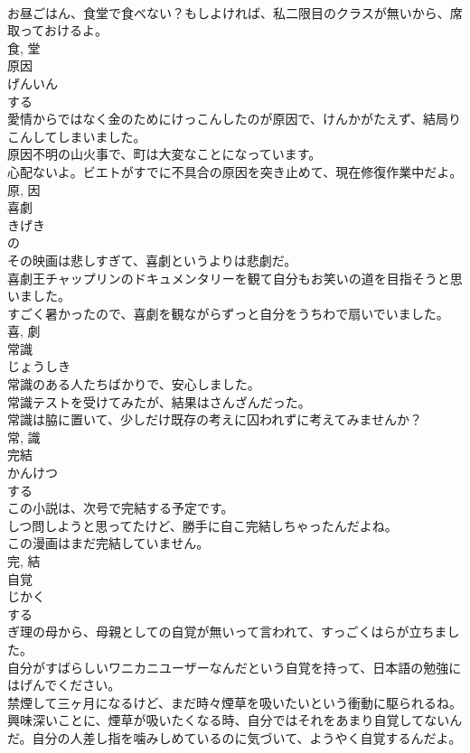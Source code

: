 \documentclass[8pt]{extreport}
\begin{document}
\begin{CJK}{UTF8}{min}
\\	お昼ごはん、食堂で食べない？もしよければ、私二限目のクラスが無いから、席取っておけるよ。	
\\	食, 堂	
\\	原因	
\\	げんいん	
\\	する 
\\	愛情からではなく金のためにけっこんしたのが原因で、けんかがたえず、結局りこんしてしまいました。	
\\	原因不明の山火事で、町は大変なことになっています。	
\\	心配ないよ。ビエトがすでに不具合の原因を突き止めて、現在修復作業中だよ。	
\\	原, 因	
\\	喜劇	
\\	きげき	
\\	の 
\\	その映画は悲しすぎて、喜劇というよりは悲劇だ。	
\\	喜劇王チャップリンのドキュメンタリーを観て自分もお笑いの道を目指そうと思いました。	
\\	すごく暑かったので、喜劇を観ながらずっと自分をうちわで扇いでいました。	
\\	喜, 劇	
\\	常識	
\\	じょうしき	
\\	常識のある人たちばかりで、安心しました。	
\\	常識テストを受けてみたが、結果はさんざんだった。	
\\	常識は脇に置いて、少しだけ既存の考えに囚われずに考えてみませんか？	
\\	常, 識	
\\	完結	
\\	かんけつ	
\\	する 
\\	この小説は、次号で完結する予定です。	
\\	しつ問しようと思ってたけど、勝手に自こ完結しちゃったんだよね。	
\\	この漫画はまだ完結していません。	
\\	完, 結	
\\	自覚	
\\	じかく	
\\	する 
\\	ぎ理の母から、母親としての自覚が無いって言われて、すっごくはらが立ちました。	
\\	自分がすばらしいワニカニユーザーなんだという自覚を持って、日本語の勉強にはげんでください。	
\\	禁煙して三ヶ月になるけど、まだ時々煙草を吸いたいという衝動に駆られるね。興味深いことに、煙草が吸いたくなる時、自分ではそれをあまり自覚してないんだ。自分の人差し指を噛みしめているのに気づいて、ようやく自覚するんだよ。	

\end{CJK}
\end{document}
